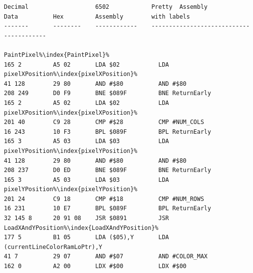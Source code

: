 \lstset{style=6502Style}
\begin{lstlisting}[basicstyle=\ttfamily\scriptsize,escapechar=\%]
Decimal                   6502            Pretty  Assembly
Data          Hex         Assembly        with labels
-------       --------    ------------    ----------------------------------------
                                          PaintPixel%\index{PaintPixel}%                                       
165 2         A5 02       LDA $02           LDA pixelXPosition%\index{pixelXPosition}%                               
41 128        29 80       AND #$80          AND #$80
208 249       D0 F9       BNE $089F         BNE ReturnEarly                                  
165 2         A5 02       LDA $02           LDA pixelXPosition%\index{pixelXPosition}%                               
201 40        C9 28       CMP #$28          CMP #NUM_COLS                                    
16 243        10 F3       BPL $089F         BPL ReturnEarly                                  
165 3         A5 03       LDA $03           LDA pixelYPosition%\index{pixelYPosition}%                               
41 128        29 80       AND #$80          AND #$80
208 237       D0 ED       BNE $089F         BNE ReturnEarly                                  
165 3         A5 03       LDA $03           LDA pixelYPosition%\index{pixelYPosition}%                               
201 24        C9 18       CMP #$18          CMP #NUM_ROWS                                    
16 231        10 E7       BPL $089F         BPL ReturnEarly                                  
32 145 8      20 91 08    JSR $0891         JSR LoadXAndYPosition%\index{LoadXAndYPosition}%                            
177 5         B1 05       LDA ($05),Y       LDA (currentLineColorRamLoPtr),Y       
41 7          29 07       AND #$07          AND #COLOR_MAX                                   
162 0         A2 00       LDX #$00          LDX #$00                                         
\end{lstlisting}
